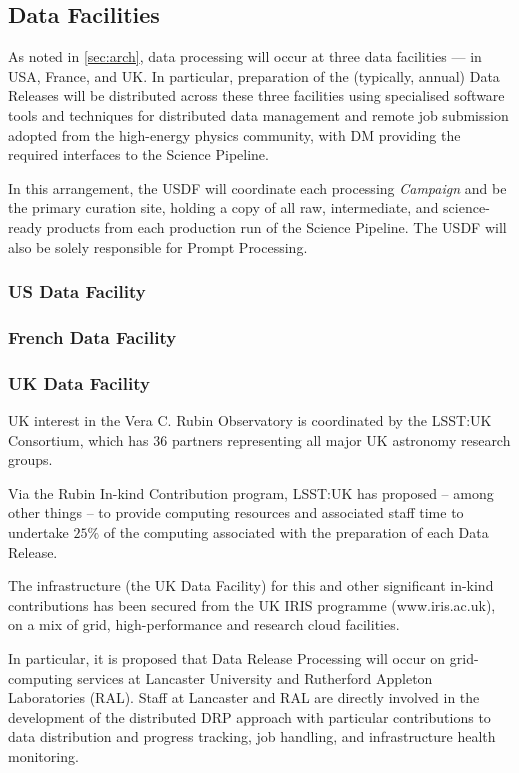 \subsection{Data Facilities} \label{sec:datafacilities}

As noted in \ref{sec:arch}, data processing will occur at three data facilities --- in USA, France, and UK. In particular, preparation of the (typically, annual) Data Releases will be distributed across these three facilities using specialised software tools and techniques for distributed data management and remote job submission adopted from the high-energy physics community, with DM providing the required interfaces to the Science Pipeline.

In this arrangement, the USDF will coordinate each processing {\em Campaign} and be the primary curation site, holding a copy of all raw, intermediate, and science-ready products from each production run of the Science Pipeline. The USDF will also be solely responsible for Prompt Processing.

\subsubsection{US Data Facility} \label{sec:ukdf}

\subsubsection{French Data Facility} \label{sec:ukdf}

\subsubsection{UK Data Facility} \label{sec:ukdf}

UK interest in the Vera C. Rubin Observatory is coordinated by the LSST:UK Consortium, which has 36 partners representing all major UK astronomy research groups.

Via the Rubin In-kind Contribution program, LSST:UK has proposed -- among other things -- to provide computing resources and associated staff time to undertake $25\%$ of the computing associated with the preparation of each Data Release.

The infrastructure (the UK Data Facility) for this and other significant in-kind contributions has been secured from the UK IRIS programme (www.iris.ac.uk), on a mix of grid, high-performance and research cloud facilities.

In particular, it is proposed that Data Release Processing will occur on grid-computing services at Lancaster University and Rutherford Appleton Laboratories (RAL). Staff at Lancaster and RAL are directly involved in the development of the distributed DRP approach with particular contributions to data distribution and progress tracking, job handling, and infrastructure health monitoring.

